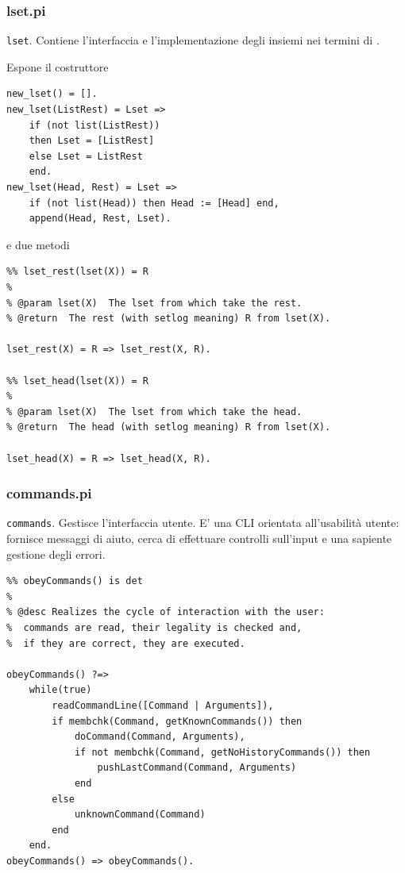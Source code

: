 \documentclass[12pt,a4paper,openright]{book} %
\begin{document}
\subsubsection{lset.pi}

\verb|lset|. Contiene l'interfaccia e l'implementazione degli insiemi nei termini di \clpset{}.

Espone il costruttore
\begin{verbatim}
new_lset() = [].
new_lset(ListRest) = Lset => 
    if (not list(ListRest)) 
    then Lset = [ListRest]
    else Lset = ListRest
    end.
new_lset(Head, Rest) = Lset =>
    if (not list(Head)) then Head := [Head] end,
    append(Head, Rest, Lset).
\end{verbatim}
e due metodi
\begin{verbatim}
%% lset_rest(lset(X)) = R
%
% @param lset(X)  The lset from which take the rest.
% @return  The rest (with setlog meaning) R from lset(X).

lset_rest(X) = R => lset_rest(X, R).

%% lset_head(lset(X)) = R
%
% @param lset(X)  The lset from which take the head.
% @return  The head (with setlog meaning) R from lset(X).

lset_head(X) = R => lset_head(X, R).
\end{verbatim}

\subsubsection{commands.pi}

\verb|commands|. Gestisce l'interfaccia utente. E' una CLI orientata all'usabilità utente: fornisce messaggi di aiuto, cerca di effettuare controlli sull'input e una sapiente gestione degli errori.

\begin{verbatim}
%% obeyCommands() is det
% 
% @desc Realizes the cycle of interaction with the user:
%  commands are read, their legality is checked and,
%  if they are correct, they are executed.

obeyCommands() ?=>
    while(true)
        readCommandLine([Command | Arguments]),
        if membchk(Command, getKnownCommands()) then
            doCommand(Command, Arguments),
            if not membchk(Command, getNoHistoryCommands()) then
                pushLastCommand(Command, Arguments)    
            end
        else 
            unknownCommand(Command)
        end
    end.
obeyCommands() => obeyCommands().
\end{verbatim}
\end{document}
